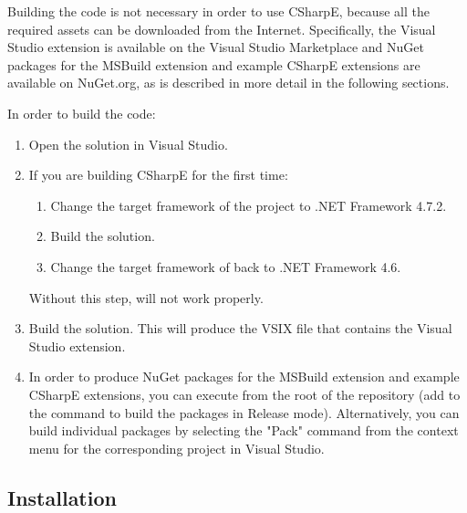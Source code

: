 Building the code is not necessary in order to use CSharpE, because all the required assets can be downloaded from the Internet. Specifically, the Visual Studio extension is available on the Visual Studio Marketplace and NuGet packages for the MSBuild extension and example CSharpE extensions are available on NuGet.org, as is described in more detail in the following sections.

In order to build the code:

\begin{enumerate}
\item Open the solution  in Visual Studio.
\item If you are building CSharpE for the first time:


\begin{enumerate}
\item Change the target framework of the project  to .NET Framework 4.7.2.
\item Build the solution.
\item Change the target framework of  back to .NET Framework 4.6.
\end{enumerate}

Without this step,  will not work properly. \cite{iactg-net46}


\item Build the solution. This will produce the VSIX file that contains the Visual Studio extension.

\item In order to produce NuGet packages for the MSBuild extension and example CSharpE extensions, you can execute  from the root of the repository (add  to the command to build the packages in Release mode). Alternatively, you can build individual packages by selecting the "Pack" command from the context menu for the corresponding project in Visual Studio.


\end{enumerate}

\subsection{Installation}

